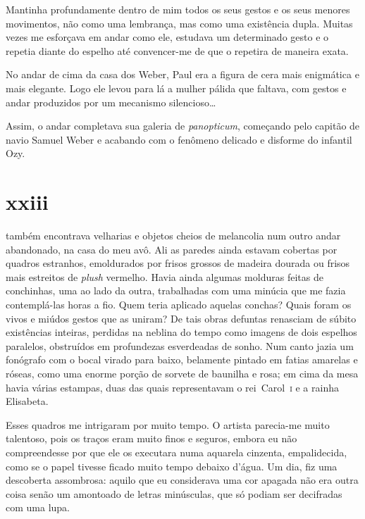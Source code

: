
Mantinha profundamente dentro de mim todos os seus gestos e os seus menores
movimentos, não como uma lembrança, mas como uma existência dupla. Muitas
vezes me esforçava em andar como ele, estudava um determinado gesto e o
repetia diante do espelho até convencer-me de que o repetira de maneira
exata.

No andar de cima da casa dos Weber, Paul era a figura de cera mais enigmática
e mais elegante. Logo ele levou para lá a mulher pálida que faltava, com
gestos e andar produzidos por um mecanismo silencioso\ldots{}

Assim, o andar completava sua galeria de \textit{panopticum}, começando pelo
capitão de navio Samuel Weber e acabando com o fenômeno delicado e disforme
do infantil Ozy.


\section{xxiii} 

 também encontrava velharias e objetos cheios de melancolia num
 outro andar abandonado, na casa do meu avô. Ali as paredes ainda estavam
 cobertas por quadros estranhos, emoldurados por frisos grossos de madeira
 dourada ou frisos mais estreitos de \textit{plush} vermelho. Havia ainda
 algumas molduras feitas de conchinhas, uma ao lado da outra, trabalhadas com
 uma minúcia que me fazia contemplá-las horas a fio. Quem teria aplicado
 aquelas conchas? Quais foram os vivos e miúdos gestos que as uniram? De tais
 obras defuntas renasciam de súbito existências inteiras, perdidas na neblina
 do tempo como imagens de dois espelhos paralelos, obstruídos em profundezas
 esverdeadas de sonho. Num canto jazia um fonógrafo com o bocal virado para
 baixo, belamente pintado em fatias amarelas e róseas, como uma enorme porção
 de sorvete de baunilha e rosa; em cima da mesa havia várias estampas, duas
 das quais representavam o rei~Carol~\textsc{i} e a rainha Elisabeta.

Esses quadros me intrigaram por muito tempo. O artista parecia-me muito
talentoso, pois os traços eram muito finos e seguros, embora eu não
compreendesse por que ele os executara numa aquarela cinzenta, empalidecida,
como se o papel tivesse ficado muito tempo debaixo d'água. Um dia, fiz uma
descoberta assombrosa: aquilo que eu considerava uma cor apagada não era
outra coisa senão um amontoado de letras minúsculas, que só podiam ser
decifradas com uma lupa.

